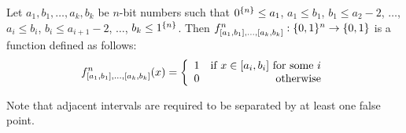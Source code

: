 
\begin{definition}
\label{def:kibf}
Let $a_1, b_1, \ldots, a_k, b_k$ be $n$-bit numbers
such that $0^{\{n\}} \leq a_1$,
$a_1 \leq b_1$,
$b_1 \leq a_2 - 2$,
$\ldots$,
$a_i \leq b_i$,
$b_i \leq a_{i+1} - 2$,
$\ldots$,
$b_k \leq 1^{\{n\}}$.
Then $f^n_{[a_1, b_1], \ldots, [a_k, b_k]}: \{0, 1\}{}^n \rightarrow \{0, 1\}{}$ is a function defined as follows:
\[f^n_{\interval{a_1}{b_1}, \ldots, \interval{a_k}{b_k}} (x) = \left\{
  \begin{array}{lr}
    1 & $if $ x \in \interval{a_i}{b_i}$ for some $i\\
    0 & $otherwise$
  \end{array}
\right.
\]
\end{definition}

Note that adjacent intervals
are required to be separated by at least one false point.

